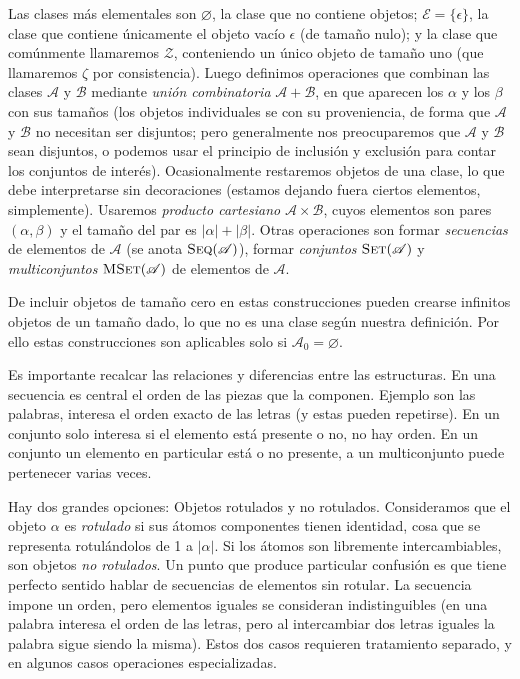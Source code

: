   Las clases más elementales son \(\varnothing\),
  la clase que no contiene objetos;
  \(\mathscr{E} = \{\epsilon\}\),
  la clase que contiene únicamente el objeto vacío \(\epsilon\)
  (de tamaño nulo);
  y la clase que comúnmente llamaremos \(\mathscr{Z}\),
  conteniendo un único objeto de tamaño uno
  (que llamaremos \(\zeta\) por consistencia).
  Luego definimos operaciones que combinan
  las clases \(\mathscr{A}\) y \(\mathscr{B}\)
  mediante \emph{unión combinatoria} \(\mathscr{A} + \mathscr{B}\),
  en que aparecen los \(\alpha\) y los \(\beta\) con sus tamaños
  (los objetos individuales se  con su proveniencia,
   de forma que \(\mathscr{A}\) y  \(\mathscr{B}\)
   no necesitan ser disjuntos;
   pero generalmente nos preocuparemos
   que \(\mathscr{A}\) y \(\mathscr{B}\)
   sean disjuntos,
   o podemos usar el principio de inclusión y exclusión
   para contar los conjuntos de interés).
  Ocasionalmente restaremos objetos de una clase,
  lo que debe interpretarse sin decoraciones
  (estamos dejando fuera ciertos elementos,
   simplemente).
  Usaremos \emph{producto cartesiano}
  \(\mathscr{A} \times \mathscr{B}\),
  cuyos elementos son pares \((\alpha, \beta)\)
  y el tamaño del par
  es \(\lvert \alpha \rvert + \lvert \beta \rvert\).
  Otras operaciones son formar \emph{secuencias}
  de elementos de \(\mathscr{A}\)
  (se anota \(\operatorname{\textsc{Seq}}(\mathscr{A})\)),
  formar \emph{conjuntos}
  \(\operatorname{\textsc{Set}}(\mathscr{A})\)
  y \emph{multiconjuntos}
  \(\operatorname{\textsc{MSet}}(\mathscr{A})\)
  de elementos de \(\mathscr{A}\).

  De incluir objetos de tamaño cero
  en estas construcciones pueden crearse infinitos objetos de un tamaño dado,
  lo que no es una clase según nuestra definición.
  Por ello estas construcciones son aplicables
  solo si \(\mathscr{A}_0 = \varnothing\).

  Es importante recalcar las relaciones y diferencias
  entre las estructuras.
  En una secuencia es central
  el orden de las piezas que la componen.
  Ejemplo son las palabras,
  interesa el orden exacto de las letras
  (y estas pueden repetirse).
  En un conjunto solo interesa si el elemento está presente o no,
  no hay orden.
  En un conjunto un elemento en particular está o no presente,
  a un multiconjunto puede pertenecer varias veces.

  Hay dos grandes opciones:
  Objetos rotulados y no rotulados.
  Consideramos que el objeto \(\alpha\) es \emph{rotulado}
  si sus átomos componentes tienen identidad,
  cosa que se representa rotulándolos de \num{1} a \(\lvert \alpha \rvert\).
  Si los átomos son libremente intercambiables,
  son objetos \emph{no rotulados}.
  Un punto que produce particular confusión
  es que tiene perfecto sentido
  hablar de secuencias de elementos sin rotular.
  La secuencia impone un orden,
  pero elementos iguales se consideran indistinguibles
  (en una palabra interesa el orden de las letras,
   pero al intercambiar dos letras iguales
   la palabra sigue siendo la misma).
  Estos dos casos requieren tratamiento separado,
  y en algunos casos operaciones especializadas.

